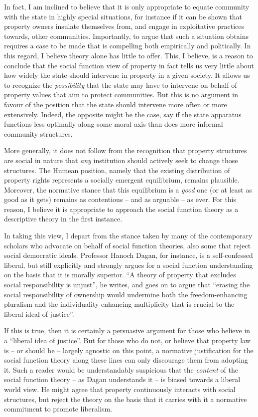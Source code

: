 In fact, I am inclined to believe that it is only appropriate to equate community with the state in highly special situations, for instance if it can be shown that property owners insulate themselves from, and engage in exploitative practices towards, other communities. Importantly, to argue that such a situation obtains requires a case to be made that is compelling both empirically and politically. In this regard, I believe theory alone has little to offer. This, I believe, is a reason to conclude that the social function view of property in fact tells us very little about how widely the state should intervene in property in a given society. It allows us to recognize the {\it possibility} that the state may have to intervene on behalf of property values that aim to protect communities. But this is no argument in favour of the position that the state should intervene more often or more extensively. Indeed, the opposite might be the case, say if the state apparatus functions less optimally along some moral axis than does more informal community structures.

More generally, it does not follow from the recognition that property structures are social in nature that {\it any} institution should actively seek to change those structures. The Humean position, namely that the existing distribution of property rights represents a socially emergent equilibrium, remains plausible. Moreover, the normative stance that this equilibrium is a {\it good} one (or at least as good as it gets) remains as contentious -- and as arguable -- as ever. For this reason, I believe it is appropriate to approach the social function theory as a descriptive theory in the first instance.

In taking this view, I depart from the stance taken by many of the contemporary scholars who advocate on behalf of social function theories, also some that reject social democratic ideals. Professor Hanoch Dagan, for instance, is a self-confessed liberal, but still explicitly and strongly argues for a social function understanding on the basis that it is morally superior. ``A theory of property that excludes social responsibility is unjust'', he writes, and goes on to argue that ``erasing the social responsibility of ownership would undermine both the freedom-enhancing pluralism and the individuality-enhancing multiplicity that is crucial to the liberal ideal of justice''.

If this is true, then it is certainly a persuasive argument for those who believe in a ``liberal idea of justice''. But for those who do not, or believe that property law is -- or should be -- largely agnostic on this point, a normative justification for the social function theory along these lines can only discourage them from adopting it. Such a reader would be understandably suspicious that the {\it content} of the social function theory -- as Dagan understands it -- is biased towards a liberal world view. He might agree that property continuously interacts with social structures, but reject the theory on the basis that it carries with it a normative commitment to promote liberalism.

